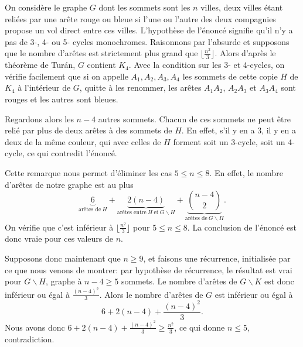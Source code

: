 \begin{sol} On considère le graphe $G$ dont les sommets sont les $n$ villes, deux villes étant reliées par une arête rouge ou bleue si l'une ou l'autre des deux compagnies propose un vol direct entre ces villes. L'hypothèse de l'énoncé signifie qu'il n'y a pas de 3-, 4- ou 5- cycles monochromes. Raisonnons par l'absurde et supposons que le nombre d'arêtes est strictement plus grand que $\lfloor \frac{n^2}{3}\rfloor$. Alors d'après le théorème de Tur\'an, $G$ contient $K_4$. Avec la condition sur les 3- et 4-cycles, on vérifie facilement que si on appelle $A_1,A_2,A_3,A_4$ les sommets  de cette copie $H$ de $K_4$ à l'intérieur de $G$, quitte à les renommer, les arêtes $A_1A_2$, $A_2A_3$ et $A_3A_4$ sont rouges et les autres sont bleues. 

Regardons alors les $n-4$ autres sommets. Chacun de ces sommets ne peut être relié par plus de deux arêtes à des sommets de $H$. En effet, s'il y en a 3, il y en a deux de la même couleur, qui avec celles de $H$ forment soit un 3-cycle, soit un 4-cycle, ce qui contredit l'énoncé. 

Cette remarque nous permet d'éliminer les cas $5\leq n\leq 8$. En effet, le nombre d'arêtes de notre graphe est au plus
$$ \underbrace{6}_{\text{arêtes de}\ H} + \underbrace{2(n-4)}_{\text{arêtes entre}\ H\ \text{et}\ G\backslash H} + \underbrace{{n-4\choose 2}}_{\text{arêtes de}\ G\backslash H}.$$
On vérifie que c'est inférieur à $\lfloor\frac{n^2}{3}\rfloor$ pour $5\leq n \leq 8$. La conclusion de l'énoncé est donc vraie pour ces valeurs de $n$.

Supposons donc maintenant que $n\geq 9$, et faisons une récurrence, initialisée par ce que nous venons de montrer: par hypothèse de récurrence, le résultat est vrai pour $G\backslash H$, graphe à $n-4\geq 5$ sommets. Le nombre d'arêtes de $G\backslash K$ est donc inférieur ou égal à $\frac{(n-4)^2}{3}$. Alors le nombre d'arêtes de $G$ est inférieur ou égal à 
$$ 6 + 2(n-4) + \frac{(n-4)^2}{3}.$$
Nous avons donc $6 + 2(n-4) + \frac{(n-4)^2}{3}\geq \frac{n^2}{3}$, ce qui donne $n\leq 5$, contradiction.
\end{sol}

\begin{sol}
\end{sol}

